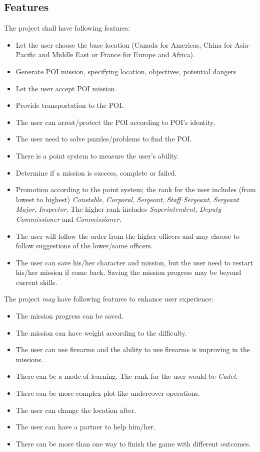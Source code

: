 \documentclass[letterpaper,12pt]{article}
\begin{document}
	\subsection{Features}
	The project shall have following features:
	\begin{itemize}
		\item Let the user choose the base location (Canada for Americas, China for Asia-Pacific and Middle East or France for Europe and Africa).
		\item Generate POI mission, specifying location, objectives, potential dangers
		\item Let the user accept POI mission.
		\item Provide transportation to the POI.
		\item The user can arrest/protect the POI according to POI's identity.
		\item The user need to solve puzzles/problems to find the POI.
		\item There is a point system to measure the user's ability.
		\item Determine if a mission is success, complete or failed.
		\item Promotion according to the point system; the rank for the user includes (from lowest to highest) \textit{Constable}, \textit{Corporal}, \textit{Sergeant}, \textit{Staff Sergeant}, \textit{Sergeant Major}, \textit{Inspector}. The higher rank includes \textit{Superintendent}, \textit{Deputy Commissioner} and \textit{Commissioner}.
		\item The user will follow the order from the higher officers and may choose to follow suggestions of the lower/same officers.
		\item The user can save his/her character and mission, but the user need to restart his/her mission if come back. Saving the mission progress may be beyond current skills.
	\end{itemize}
	The project \emph{may} have following features to enhance user experience:
	\begin{itemize}
		\item The mission progress can be saved.
		\item The mission can have weight according to the difficulty.
		\item The user can use firearms and the ability to use firearms is improving in the missions.
		\item There can be a mode of learning. The rank for the user would be \textit{Cadet}.
		\item There can be more complex plot like undercover operations.
		\item The user can change the location after.
		\item The user can have a partner to help him/her.
		\item There can be more than one way to finish the game with different outcomes.
	\end{itemize}
\end{document}
